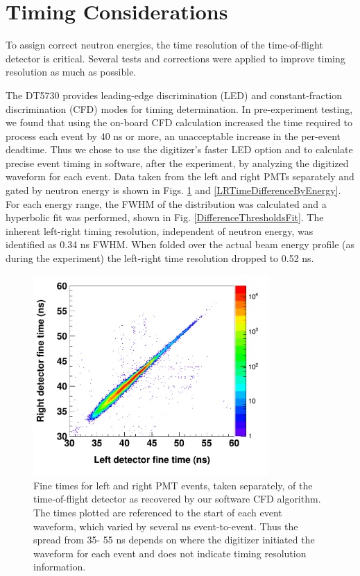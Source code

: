 \section{Timing Considerations}
To assign correct neutron energies, the time resolution of the time-of-flight
detector is critical. Several tests and corrections were applied to improve
timing resolution as much as possible.

The DT5730 provides leading-edge discrimination (\gls{LED}) and constant-fraction discrimination
(\gls{CFD}) modes for timing determination. In pre-experiment testing, we found that using the
on-board CFD calculation increased the time required to process each event by 40
ns or more, an unacceptable increase in the per-event deadtime. Thus we chose
to use the digitizer's faster LED option and to calculate precise event timing
in software, after the experiment, by analyzing the digitized waveform for each event.
Data taken from the left and right PMTs separately and gated by neutron energy 
is shown in Figs. \ref{LRCorrelation} and \ref{LRTimeDifferenceByEnergy}. 
For each energy range, the FWHM of the distribution was calculated and a hyperbolic fit was
performed, shown in Fig. \ref{DifferenceThresholdsFit}. The inherent left-right timing 
resolution, independent of neutron energy, was identified as 0.34 ns FWHM.
When folded over the actual beam energy profile (as during the experiment)
the left-right time resolution dropped to 0.52 ns.

\begin{figure}[tb]
    \centering
    \includegraphics[width=0.8\textwidth]{figures/LRCorrelation.png}
    \caption[Event times for left and right PMTs of time-of-flight detector]
    {Fine times for left and right PMT events, taken separately, of the time-of-flight 
        detector as recovered by our software \gls{CFD} algorithm. The times plotted are referenced
        to the start of each event waveform, which varied by several ns event-to-event.
        Thus the spread from 35-
        55 ns depends on where the digitizer initiated the waveform for each
        event and does not indicate timing resolution information.}
    \label{LRCorrelation}
\end{figure}

